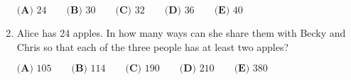 \documentclass{article}
\begin{document}
\begin{enumerate}[label=\arabic*., itemsep=0.5em]
\(\textbf{(A) }24\qquad\textbf{(B) }30\qquad\textbf{(C) }32\qquad\textbf{(D) }36\qquad\textbf{(E) }40\)\par \vspace{0.5em}\item Alice has 24 apples. In how many ways can she share them with Becky and
Chris so that each of the three people has at least two apples?

\(\textbf{(A) }105\qquad\textbf{(B) }114\qquad\textbf{(C) }190\qquad\textbf{(D) }210\qquad\textbf{(E) }380\)\par \vspace{0.5em}\end{enumerate}
\end{document}
